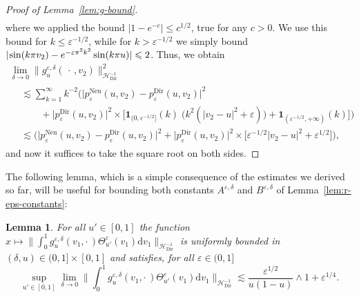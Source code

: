 \documentclass[10pt]{amsart}
\newtheorem{lemm}[theo]{Lemma}\newtheorem{prop}[theo]{Proposition}\newtheorem{coro}[theo]{Corollary}\newtheorem{conj}[theo]{Conjecture}
\theoremstyle{definition}\newtheorem{defi}[theo]{Definition}\newtheorem{rema}[theo]{Remark}\newtheorem{exam}[theo]{Example}\newtheorem{exem}[theo]{Example}\newtheorem{nota}[theo]{Notation}
\DeclareMathOperator{\Dir}{Dir}
\DeclareMathOperator{\Neu}{Neu}
\newcommand{\mc}[1]{{\mathcal #1}}
\renewcommand{\mc}[1]{{\mathcal #1}}
\renewcommand{\leq}{\leqslant}
\renewcommand{\le}{\leqslant}
\newcommand*{\dd}{\mathrm{d}}
\newcommand*{\dv}{\dd v}
\newcommand*{\Mk}{\mkern -2mu}
\begin{document}
\begin{proof}[Proof of Lemma~\ref{lem:g-bound}]
\begin{align*}
\end{align*}
where we applied the bound $|1 - e^{-c}| \le c^{1/2}$, true for any $c>0$. We use this bound for $k \leq \varepsilon^{- 1/2}$, while for $k > \varepsilon^{- 1/2}$ we simply bound $|\Mk\sin (k \pi v_2) - e^{- \varepsilon \pi^2 k^2} \sin (k \pi u)| \le 2$. Thus, we obtain
\begin{multline*}
\lim_{\delta \rightarrow 0} \big\| g^{\varepsilon, \delta}_u (\,\cdot\,, v_2) \big\|_{\mc H_{\Dir}^{- 1}}^2\\
\begin{aligned}
& \lesssim \sum_{k = 1}^{\infty} k^{- 2} \bigg(\big| p^{\Neu}_{\varepsilon} (u, v_2) - p^{\Dir}_{\varepsilon} (u, v_2) \big|^2 \\
& \qquad + \big|p^{\Dir}_{\varepsilon} (u, v_2)\big|^2 \times \big[\mathbf{1}_{(0, \varepsilon^{- 1/2}]}(k)\; \big(k^2 (| v_2 - u |^2 + \varepsilon)\big) +\mathbf{1}_{(\varepsilon^{- 1/2},+\infty)}(k)\big]\bigg)\\
& \lesssim \Big(\big| p^{\Neu}_{\varepsilon} (u, v_2) - p^{\Dir}_{\varepsilon} (u, v_2) \big|^2 + \big|p^{\Dir}_{\varepsilon} (u, v_2)\big|^2 \times \big[\varepsilon^{- 1/2} | v_2 - u |^2 + \varepsilon^{1/2}\big]\Big),
\end{aligned}
\end{multline*}
and now it suffices to take the square root on both sides.
\end{proof}

The following lemma, which is a simple consequence of the estimates we derived so far, will be useful for bounding both constants $A^{\varepsilon, \delta}$ and $B^{\varepsilon, \delta}$ of Lemma~\ref{lem:r-eps-constants}:

\begin{lemm}\label{lem:g-theta-bound}
For all $u' \in [0,1]$ the function $x\mapsto \big\| \int_0^1 g^{\varepsilon, \delta}_u (v_1, \cdot\,) \Theta^{\varepsilon}_{u'} (v_1) \dv_1 \big\|_{\mc H_{\Dir}^{-1}}$ is uniformly bounded in $(\delta,u) \in (0,1] \times [0,1]$ and satisfies, for all $\varepsilon \in (0,1]$
\[
\sup_{u' \in [0, 1]} \lim_{\delta \rightarrow 0} \bigg\| \int_0^1 g^{\varepsilon, \delta}_u (v_1, \cdot\,) \Theta^{\varepsilon}_{u'} (v_1) \dv_1 \bigg\|_{\mc H_{\Dir}^{- 1}} \lesssim \frac{\varepsilon^{1/2}}{u (1 - u)} \wedge 1 + \varepsilon^{1/4}.
\]
\end{lemm}
\end{document}
